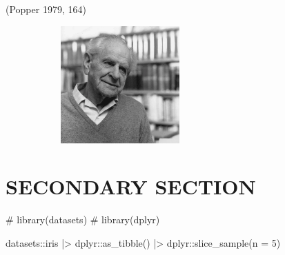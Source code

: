\documentclass[
  12pt,
  a4paper,
  oneside]{tesesusp}
\newenvironment{Shaded}{\begin{snugshade}}{\end{snugshade}}
\newcommand{\AttributeTok}[1]{\textcolor[rgb]{0.40,0.45,0.13}{#1}}
\newcommand{\CommentTok}[1]{\textcolor[rgb]{0.37,0.37,0.37}{#1}}
\newcommand{\DecValTok}[1]{\textcolor[rgb]{0.68,0.00,0.00}{#1}}
\newcommand{\FunctionTok}[1]{\textcolor[rgb]{0.28,0.35,0.67}{#1}}
\newcommand{\NormalTok}[1]{\textcolor[rgb]{0.00,0.23,0.31}{#1}}
\newcommand{\SpecialCharTok}[1]{\textcolor[rgb]{0.37,0.37,0.37}{#1}}
\begin{document}
\vspace{15pt}

\noindent \hspace*{\fill} (Popper 1979, 164)

\begin{figure}

\caption{\label{fig-karl-popper}Karl Popper (July 25, 1902 -- September
17, 1994).\\
One of the 20th century's most influential philosophers of science.}

{\centering 

\begin{figure}[H]

{\centering \includegraphics[width=0.5\textwidth,height=\textheight]{images/karl-popper.png}

}

\end{figure}

}

\end{figure}

\hypertarget{secondary-section}{%
\section{SECONDARY SECTION}\label{secondary-section}}

\begin{Shaded}
\begin{Highlighting}[numbers=left,,]
\CommentTok{\# library(datasets)}
\CommentTok{\# library(dplyr)}

\NormalTok{datasets}\SpecialCharTok{::}\NormalTok{iris }\SpecialCharTok{|\textgreater{}}
\NormalTok{  dplyr}\SpecialCharTok{::}\FunctionTok{as\_tibble}\NormalTok{() }\SpecialCharTok{|\textgreater{}}
\NormalTok{  dplyr}\SpecialCharTok{::}\FunctionTok{slice\_sample}\NormalTok{(}\AttributeTok{n =} \DecValTok{5}\NormalTok{)}
\end{Highlighting}
\end{Shaded}
\end{document}
